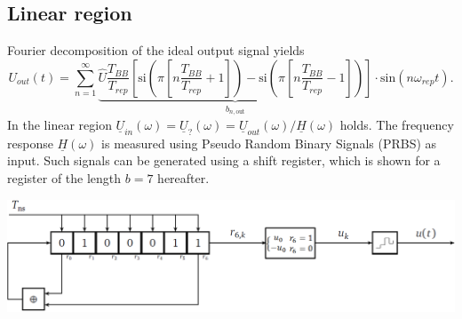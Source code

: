 \documentclass[paper=a0,accentcolor=tud9b,colorbacktitle,colorbacksubtitle]{tudposter}
\begin{document}
\begin{multicols}{2}
	\section{Linear region}	
	 Fourier decomposition of the ideal output signal yields
	 \fontsize{33}{40}
	      \begin{equation*}
	      \textstyle
		U_{out}(t)=\sum \limits_{n=1}^\infty \underbrace{\hat{U}\frac{T_{BB}}{T_{rep}}\left[\text{si}\left(\pi\left[n\frac{T_{BB}}{T_{rep}}+1\right]\right)-
		\text{si}\left(\pi\left[n\frac{T_{BB}}{T_{rep}}-1\right]\right)\right]}_{b_{n,\text{out}}}\cdot \text{sin}(n\omega_{rep}t).
	      \label{U_out}
	      \end{equation*}
	 \fontsize{35}{40}     
	 In the linear region $\textstyle \underline{U}_{in}(\omega)=\underline{U}_?(\omega)=\underline{U}_{out}(\omega)/\underline{H}(\omega)$ holds. The frequency
	 response $\textstyle \underline{H}(\omega)$ is measured using Pseudo Random Binary Signals (PRBS) as input. Such signals can be generated using a shift register, 
	 which is shown for a register of the length $\textstyle b=7$ hereafter.
	 
	 \begin{center}	
	\includegraphics[scale=1.1]{Schieberegister.eps}
	\label{Modellierung}
	\end{center}
	 

\end{multicols}
\end{document}
